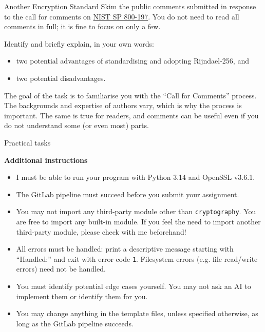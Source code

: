 \documentclass{homework}
\begin{document}
\begin{task}{Another Encryption Standard}
  Skim the public comments submitted in response to the call for comments on \href{https://csrc.nist.gov/pubs/sp/800/197/iprd}{NIST SP 800-197}.
  You do not need to read all comments in full; it is fine to focus on only a few.

  Identify and briefly explain, in your own words:
  \begin{itemize}
    \item two potential advantages of standardising and adopting Rijndael-256, and
    \item two potential disadvantages.
  \end{itemize}

  The goal of the task is to familiarise you with the \enquote{Call for Comments} process.
  The backgrounds and expertise of authors vary, which is why the process is important.
  The same is true for readers, and comments can be useful even if you do not understand some (or even most) parts.
\end{task}

\newpage
\setcounter{task}{0}

\begin{center}
  Practical tasks
\end{center}

\textbf{Additional instructions}

\begin{itemize}
  \item I must be able to run your program with Python 3.14 and OpenSSL v3.6.1\footnotemark{}.
  \item The GitLab pipeline must succeed before you submit your assignment.
  \item You may not import any third-party module other than \texttt{cryptography}.
  You are free to import any built-in module.
  If you feel the need to import another third-party module, please check with me beforehand!
  \item All errors must be handled: print a descriptive message starting with \enquote{Handled:} and exit with error code \texttt{1}.
  Filesystem errors (e.g. file read/write errors) need not be handled.
  \item You must identify potential edge cases yourself.
  You may not ask an AI to implement them or identify them for you.
  \item You may change anything in the template files, unless specified otherwise, as long as the GitLab pipeline succeeds.
\end{itemize}
\end{document}
